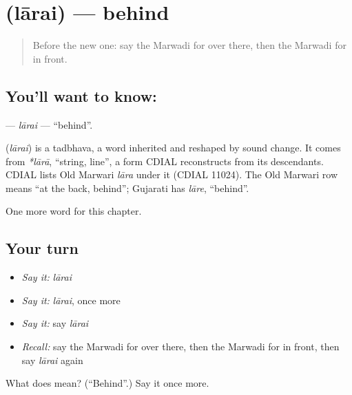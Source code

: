 \section[\texorpdfstring{\mw{लारै} (lārai)}{लारै (lārai)}]{ (lārai) — behind}

\label{lesson:MW-C96-larai}



\begin{quote}
Before the new one: say the Marwadi for over there, then the Marwadi for in front.
\end{quote}

\subsection*{You'll want to know: }
\textbf{} — \emph{lārai} — \textquotedblleft{}behind\textquotedblright{}.

\begin{cousinweb}
\textbf{} (\emph{lārai}) is a tadbhava, a word inherited and reshaped by sound change. It comes from \emph{*lārā}, \textquotedblleft{}string, line\textquotedblright{}, a form CDIAL reconstructs from its descendants. CDIAL lists Old Marwari \emph{lāra} under it (CDIAL 11024). The Old Marwari row means \textquotedblleft{}at the back, behind\textquotedblright{}; Gujarati has \emph{lāre}, \textquotedblleft{}behind\textquotedblright{}.
\end{cousinweb}

\begin{grammarlens}[title={What you've built}]
One more word for this chapter.
\end{grammarlens}

\subsection*{Your turn}
\begin{itemize}
\raggedright
  \item \emph{Say it:} \emph{lārai}
  \item \emph{Say it:} \emph{lārai}, once more
  \item \emph{Say it:} say \emph{lārai}
  \item \emph{Recall:} say the Marwadi for over there, then the Marwadi for in front, then say \emph{lārai} again
\end{itemize}

\begin{tcolorbox}[breakable,colback=teal!4,colframe=teal!35!black,title={Before you move on}]
What does  mean? (\textquotedblleft{}Behind\textquotedblright{}.) Say it once more.
\end{tcolorbox}
